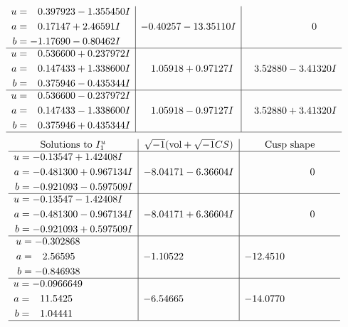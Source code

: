 \documentclass[1p]{elsarticle_modified}
\theoremstyle{definition}
\newcommand{\I}{\sqrt{-1}}
\begin{document}
$$\begin{array}{c|c|c}
\begin{aligned}
u &= \phantom{-}0.397923 - 1.355450 I \\
a &= \phantom{-}0.17147 + 2.46591 I \\
b &= -1.17690 - 0.80462 I\end{aligned}
 & -0.40257 - 13.35110 I & \phantom{-0.000000 } 0 \\ \hline\begin{aligned}
u &= \phantom{-}0.536600 + 0.237972 I \\
a &= \phantom{-}0.147433 + 1.338600 I \\
b &= \phantom{-}0.375946 - 0.435344 I\end{aligned}
 & \phantom{-}1.05918 + 0.97127 I & \phantom{-}3.52880 - 3.41320 I \\ \hline\begin{aligned}
u &= \phantom{-}0.536600 - 0.237972 I \\
a &= \phantom{-}0.147433 - 1.338600 I \\
b &= \phantom{-}0.375946 + 0.435344 I\end{aligned}
 & \phantom{-}1.05918 - 0.97127 I & \phantom{-}3.52880 + 3.41320 I\\
 \hline 
 \end{array}$$\newpage$$\begin{array}{c|c|c}  
\text{Solutions to }I^u_{1}& \I (\text{vol} + \sqrt{-1}CS) & \text{Cusp shape}\\
 \hline 
\begin{aligned}
u &= -0.13547 + 1.42408 I \\
a &= -0.481300 + 0.967134 I \\
b &= -0.921093 - 0.597509 I\end{aligned}
 & -8.04171 - 6.36604 I & \phantom{-0.000000 } 0 \\ \hline\begin{aligned}
u &= -0.13547 - 1.42408 I \\
a &= -0.481300 - 0.967134 I \\
b &= -0.921093 + 0.597509 I\end{aligned}
 & -8.04171 + 6.36604 I & \phantom{-0.000000 } 0 \\ \hline\begin{aligned}
u &= -0.302868\phantom{ +0.000000I} \\
a &= \phantom{-}2.56595\phantom{ +0.000000I} \\
b &= -0.846938\phantom{ +0.000000I}\end{aligned}
 & -1.10522\phantom{ +0.000000I} & -12.4510\phantom{ +0.000000I} \\ \hline\begin{aligned}
u &= -0.0966649\phantom{ +0.000000I} \\
a &= \phantom{-}11.5425\phantom{ +0.000000I} \\
b &= \phantom{-}1.04441\phantom{ +0.000000I}\end{aligned}
 & -6.54665\phantom{ +0.000000I} & -14.0770\phantom{ +0.000000I}\\
 \hline 
 \end{array}$$\newpage\newpage\renewcommand{\arraystretch}{1}
\end{document}

